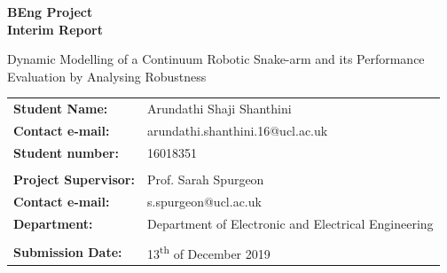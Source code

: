 \documentclass[a4paper,12pt]{report}
\author{Arundathi Shaji Shanthini}
\begin{document}
\begin{titlepage}
    \setlength{\voffset}{-1.8in}
    \noindent \noindent {}
    
    \vspace{30mm}

    \begin{center}
        {\LARGE \textbf{BEng Project}}\\
        \vspace{4mm}
        {\Huge \textbf{Interim Report}}
    \end{center}
    
    \vspace{10mm}
    
    \begin{center}
    \begin{spacing}{1.8}
    {\LARGE
   Dynamic Modelling of a Continuum Robotic Snake-arm and its Performance Evaluation by Analysing Robustness}
    \end{spacing}
    \end{center}
    
   \vspace{5mm}
    
     \begin{tabular}{ll}
        \textbf{Student Name:}  & \hspace{4mm} Arundathi Shaji Shanthini \\
       \textbf{Contact e-mail:} & \hspace{4mm} arundathi.shanthini.16@ucl.ac.uk \\
        \textbf{Student number:} & \hspace{4mm} 16018351 \\ \\ 
        \textbf{Project Supervisor:}  & \hspace{4mm} Prof. Sarah Spurgeon \\
        \textbf{Contact e-mail:}  & \hspace{4mm} s.spurgeon@ucl.ac.uk \\
         \textbf{Department:} & \hspace{4mm} Department of Electronic and Electrical Engineering\\ \\ 
          \textbf{Submission Date:} & \hspace{4mm} 13\textsuperscript{th} of December 2019
    \end{tabular}
\end{titlepage}
\end{document}
